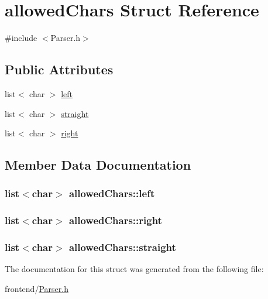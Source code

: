 \hypertarget{structallowedChars}{\section{allowed\-Chars Struct Reference}
\label{structallowedChars}
}


{\ttfamily \#include $<$Parser.\-h$>$}

\subsection*{Public Attributes}
\begin{DoxyCompactItemize}
\item 
list$<$ char $>$ \hyperlink{structallowedChars_aa455ccda98e8c550c1b7cf7bc8dcabcd}{left}
\item 
list$<$ char $>$ \hyperlink{structallowedChars_a7d7caec9cd32a1a362e845a38ef1561c}{straight}
\item 
list$<$ char $>$ \hyperlink{structallowedChars_a2aa7cf42bc94729fc3f5d3004d60d662}{right}
\end{DoxyCompactItemize}


\subsection{Member Data Documentation}
\hypertarget{structallowedChars_aa455ccda98e8c550c1b7cf7bc8dcabcd}{
\subsubsection[{left}]{\setlength{\rightskip}{0pt plus 5cm}list$<$char$>$ allowed\-Chars\-::left}}\label{structallowedChars_aa455ccda98e8c550c1b7cf7bc8dcabcd}
\hypertarget{structallowedChars_a2aa7cf42bc94729fc3f5d3004d60d662}{
\subsubsection[{right}]{\setlength{\rightskip}{0pt plus 5cm}list$<$char$>$ allowed\-Chars\-::right}}\label{structallowedChars_a2aa7cf42bc94729fc3f5d3004d60d662}
\hypertarget{structallowedChars_a7d7caec9cd32a1a362e845a38ef1561c}{
\subsubsection[{straight}]{\setlength{\rightskip}{0pt plus 5cm}list$<$char$>$ allowed\-Chars\-::straight}}\label{structallowedChars_a7d7caec9cd32a1a362e845a38ef1561c}


The documentation for this struct was generated from the following file\-:\begin{DoxyCompactItemize}
\item 
frontend/\hyperlink{Parser_8h}{Parser.\-h}\end{DoxyCompactItemize}
